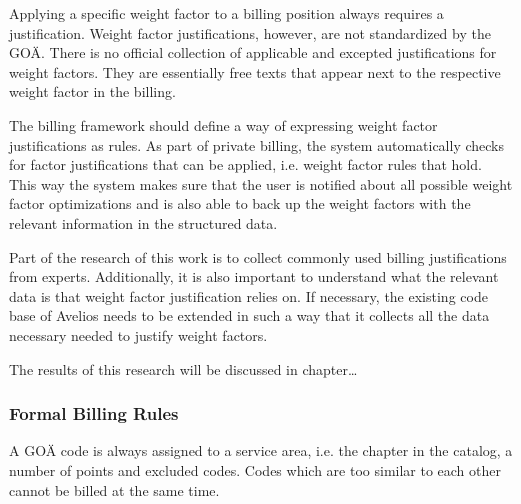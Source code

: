 Applying a specific weight factor to a billing position always requires a justification.
Weight factor justifications, however, are not standardized by the GOÄ\cite[]{bruck1998kommentar}.
There is no official collection of applicable and excepted justifications for weight factors.
They are essentially free texts that appear next to the respective weight factor in the billing.


The billing framework should define a way of expressing weight factor justifications as rules.
As part of private billing, the system automatically checks for factor justifications that can be applied, i.e. weight factor rules that hold.
This way the system makes sure that the user is notified about all possible weight factor optimizations and is also able to back up the weight factors with the relevant information in the structured data.

Part of the research of this work is to collect commonly used billing justifications from experts.
Additionally, it is also important to understand what the relevant data is that weight factor justification relies on.
If necessary, the existing code base of Avelios needs to be extended in such a way that it collects all the data necessary needed to justify weight factors.

The results of this research will be discussed in chapter\ldots

\subsubsection{Formal Billing Rules}



A GOÄ code is always assigned to a service area, i.e. the chapter in the catalog, a number of points and excluded codes.
Codes which are too similar to each other cannot be billed at the same time.


